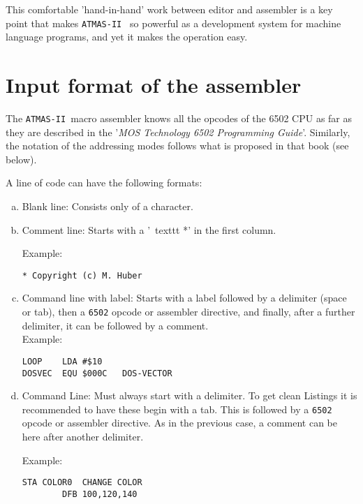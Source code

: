 \documentclass[10pt,a4paper,twoside,final,openright,titlepage]{memoir}
\def\atmas{\texttt{AT\-MAS-II }}
\newcommand{\key}[1]{\keystroke{\tiny #1}}
\begin{document}
This comfortable 'hand-in-hand' work between editor and assembler is a key point that makes \atmas
so powerful as a development system for machine language programs, and yet it makes the operation easy.

\section{Input format of the assembler}

The \atmas macro assembler knows all the opcodes of the 6502 CPU as far as they are described in the
'\textit{MOS Technology 6502 Programming Guide}'. Similarly, the notation of the addressing modes follows
what is proposed in that book (see below).

A line of code can have the following formats:

\begin{enumerate}[a)]
\item Blank line: Consists only of a \key{RETURN} character.

\item Comment line: Starts with a '\ texttt {*}' in the first column. 

Example:
\begin{Verbatim}
* Copyright (c) M. Huber
\end{Verbatim}

\item Command line with label: Starts with a label followed by a delimiter (space or tab),
then a \texttt{6502} opcode or assembler directive, and finally, after a further delimiter,
it can be followed by a comment. \\

Example:
\begin{Verbatim}[samepage=true]
LOOP    LDA #$10
DOSVEC  EQU $000C	DOS-VECTOR
\end{Verbatim}

\item Command Line: Must always start with a delimiter. To get clean Listings it is recommended
to have these begin with a tab. This is followed by a \texttt {6502} opcode or assembler directive.
As in the previous case, a comment can be here after another delimiter.

Example:
\begin{Verbatim}[samepage=true]
        STA COLOR0 	CHANGE COLOR
        DFB 100,120,140
\end{Verbatim}
\end{enumerate}
\end{document}
